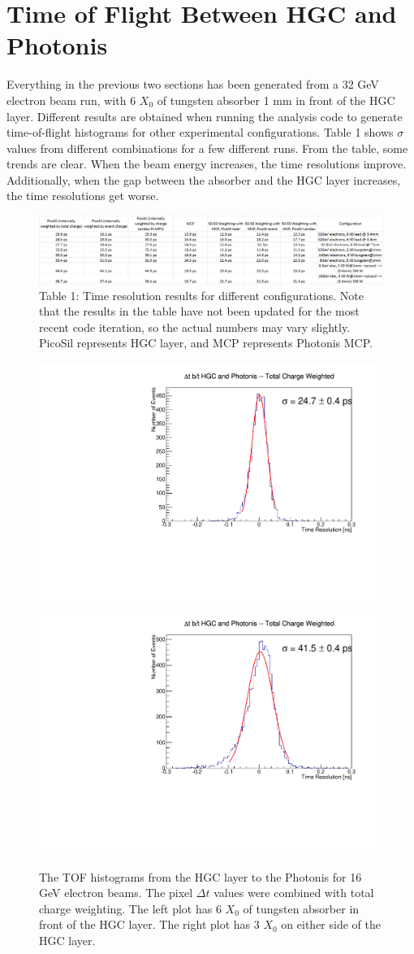 \documentclass[12pt]{article}
\begin{document}
\section{Time of Flight Between HGC and Photonis}
Everything in the previous two sections has been generated from a 32 GeV electron beam run, with 6 $X_0$ of tungsten absorber 1 mm in front of the HGC layer. 
Different results are obtained when running the analysis code to generate time-of-flight histograms for other experimental configurations.
Table 1 shows $\sigma$ values from different combinations for a few different runs.
From the table, some trends are clear. 
When the beam energy increases, the time resolutions improve. 
Additionally, when the gap between the absorber and the HGC layer increases, the time resolutions get worse.

\begin{figure}[t]
\centering
	\includegraphics[width=\linewidth]{table_longitudinal_analysis.png}
	\caption*{Table 1:
	Time resolution results for different configurations.
	Note that the results in the table have not been updated for the most recent code iteration,
	so the actual numbers may vary slightly.
	PicoSil represents HGC layer, and MCP represents Photonis MCP.}
\end{figure}

\begin{figure}[ht]
\centering
	\includegraphics[width=0.49\linewidth]{deltaT_PicoSil_vs_MCP_TotalCharge_16gev.pdf}
	\includegraphics[width=0.49\linewidth]{deltaT_PicoSil_vs_MCP_TotalCharge_16gevDelay.pdf}
	\caption{The TOF histograms from the HGC layer to the Photonis for 16 GeV electron beams.
	The pixel $\Delta t$ values were combined with total charge weighting.
	The left plot has 6 $X_0$ of tungsten absorber in front of the HGC layer.
	The right plot has 3 $X_0$ on either side of the HGC layer.}
	\label{fig:HGCvsMCP}
\end{figure}
\end{document}

